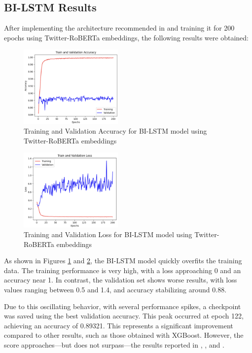 \subsection{BI-LSTM Results}

After implementing the architecture recommended in \cite{walters2023hate} and training it for 200 epochs using Twitter-RoBERTa embeddings, the following results were obtained:

\begin{figure}[H]
    \centering
    \includegraphics[width=0.45\textwidth]{images/trainingValidationAccurayBI_LSTM.png}
    \caption{Training and Validation Accuracy for BI-LSTM model using Twitter-RoBERTa embeddings}
    \label{fig:accuracy_bilstm}
\end{figure}

\begin{figure}[H]
    \centering
    \includegraphics[width=0.45\textwidth]{images/trainingValidationLossBI_LSTM.png}
    \caption{Training and Validation Loss for BI-LSTM model using Twitter-RoBERTa embeddings}
    \label{fig:loss_bilstm}
\end{figure}

As shown in Figures \ref{fig:accuracy_bilstm} and \ref{fig:loss_bilstm}, the BI-LSTM model quickly overfits the training data. The training performance is very high, with a loss approaching 0 and an accuracy near 1. In contrast, the validation set shows worse results, with loss values ranging between 0.5 and 1.4, and accuracy stabilizing around 0.88.

Due to this oscillating behavior, with several performance spikes, a checkpoint was saved using the best validation accuracy. This peak occurred at epoch 122, achieving an accuracy of 0.89321. This represents a significant improvement compared to other results, such as those obtained with XGBoost. However, the score approaches—but does not surpass—the results reported in \cite{fieri2023offensive}, \cite{almeida2023comparison}, and \cite{walters2023hate}.

